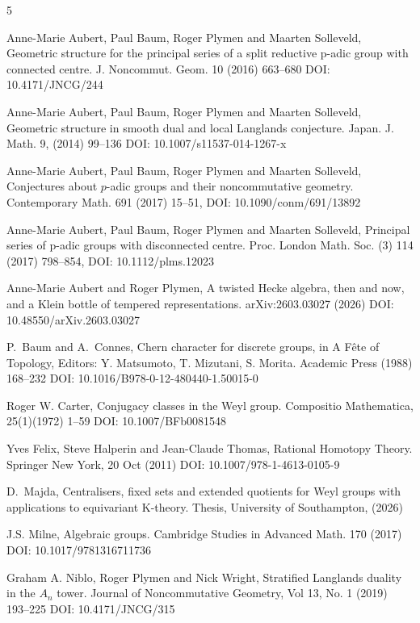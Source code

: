 \documentclass[11pt,a4paper]{article}
\begin{document}
\bigskip\bigskip
\begin{thebibliography}{5}


 Anne-Marie Aubert, Paul Baum, Roger Plymen and Maarten Solleveld, Geometric structure for the principal series of a split reductive p-adic group with connected centre. J. Noncommut. Geom. 10 (2016) 663--680 DOI: 10.4171/JNCG/244


 Anne-Marie Aubert, Paul Baum, Roger Plymen and Maarten Solleveld,
Geometric structure in smooth dual and local Langlands conjecture. Japan. J. Math. 9, (2014) 99--136 DOI: 10.1007/s11537-014-1267-x


 Anne-Marie Aubert, Paul Baum, Roger Plymen and Maarten Solleveld, Conjectures about $p$-adic groups and their noncommutative geometry. Contemporary Math. 691 (2017) 15--51, DOI: 10.1090/conm/691/13892

 Anne-Marie Aubert, Paul Baum, Roger Plymen and Maarten Solleveld, Principal series of p-adic groups with disconnected centre. Proc. London Math. Soc. (3) 114 (2017) 798--854, DOI: 10.1112/plms.12023

 Anne-Marie Aubert and Roger Plymen, A twisted Hecke algebra, then and now, and a Klein bottle of tempered representations. arXiv:2603.03027 (2026) DOI: 10.48550/arXiv.2603.03027


 P.~Baum and A.~Connes, Chern character for discrete groups, in A Fête of Topology, Editors: Y. Matsumoto, T. Mizutani, S. Morita. Academic Press (1988) 168--232 DOI: 10.1016/B978-0-12-480440-1.50015-0



 Roger W. Carter, Conjugacy classes in the Weyl group. Compositio Mathematica, 25(1)(1972) 1--59 DOI: 10.1007/BFb0081548


 Yves Felix, Steve Halperin and Jean-Claude Thomas, Rational Homotopy Theory.
Springer New York, 20 Oct (2011)
DOI: 10.1007/978-1-4613-0105-9


 D.~Majda, Centralisers, fixed sets and extended quotients for Weyl groups with applications to equivariant K-theory. Thesis, University of Southampton, (2026)

 J.S. Milne, Algebraic groups. Cambridge Studies in Advanced Math. 170 (2017) DOI: 10.1017/9781316711736

 Graham A. Niblo, Roger Plymen and Nick Wright, Stratified Langlands duality in the $A_n$ tower. Journal of Noncommutative Geometry, Vol 13, No. 1 (2019) 193--225 DOI: 10.4171/JNCG/315


\end{thebibliography}
\end{document}
